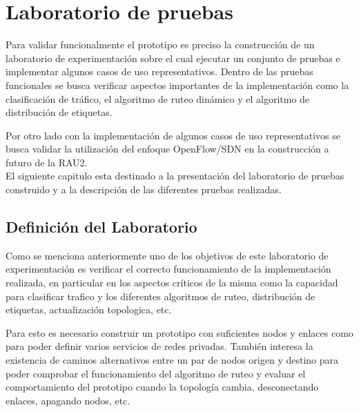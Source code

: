 \chapter{Laboratorio de pruebas}
\label{chapter6}

\ifpdf
    \graphicspath{{Chapter6/Figs/Raster/}{Chapter6/Figs/PDF/}{Chapter6/Figs/}}
\else
    \graphicspath{{Chapter6/Figs/Vector/}{Chapter6/Figs/}}
\fi

Para validar funcionalmente el prototipo es preciso la construcción de un laboratorio de experimentación sobre el cual ejecutar un conjunto de pruebas e implementar algunos casos de uso representativos. Dentro de las pruebas funcionales se busca verificar aspectos importantes de la implementaci\'on como la clasificación de tr\'afico, el algoritmo de ruteo dinámico y el algoritmo de distribución de etiquetas.

Por otro lado con la implementaci\'on de algunos casos de uso representativos se busca validar la utilización del enfoque OpenFlow/SDN en la construcci\'on a futuro de la RAU2.\\

El siguiente capitulo esta destinado a la presentación del laboratorio de pruebas construido y a la descripción de las diferentes pruebas realizadas.

\section{Definición del Laboratorio}

Como se menciona anteriormente uno de los objetivos de este laboratorio de experimentaci\'on es verificar el correcto funcionamiento de la implementaci\'on realizada, en particular en los aspectos críticos de la misma como la capacidad para clasificar trafico y los diferentes algoritmos de ruteo, distribución de etiquetas, actualización topologica, etc. 

Para esto es necesario construir un prototipo con suficientes nodos y enlaces como para poder definir varios servicios de redes privadas. Tambi\'en interesa la existencia de caminos alternativos entre un par de nodos origen y destino para poder comprobar el funcionamiento del algoritmo de ruteo y evaluar el comportamiento del prototipo cuando la topolog\'ia cambia, desconectando enlaces, apagando nodos, etc.\\

